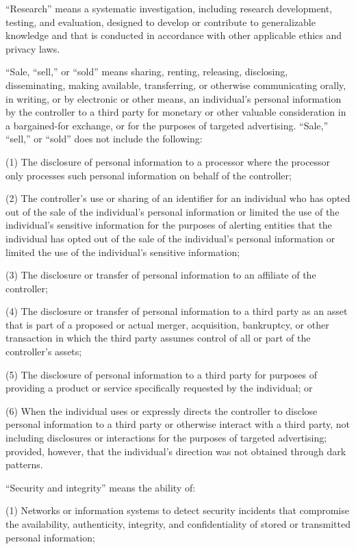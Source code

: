 “Research” means a systematic investigation, including research development, testing, and evaluation, designed to develop or contribute to generalizable knowledge and that is conducted in accordance with other applicable ethics and privacy laws.

“Sale, “sell,” or “sold” means sharing, renting, releasing, disclosing, disseminating, making available, transferring, or otherwise communicating orally, in writing, or by electronic or other means, an individual’s personal information by the controller to a third party for monetary or other valuable consideration in a bargained-for exchange, or for the purposes of targeted advertising. “Sale,” “sell,” or “sold” does not include the following:

(1) The disclosure of personal information to a processor where the processor only processes such personal information on behalf of the controller;

(2) The controller’s use or sharing of an identifier for an individual who has opted out of the sale of the individual’s personal information or limited the use of the individual’s sensitive information for the purposes of alerting entities that the individual has opted out of the sale of the individual’s personal information or limited the use of the individual’s sensitive information;

(3) The disclosure or transfer of personal information to an affiliate of the controller; 

(4) The disclosure or transfer of personal information to a third party as an asset that is part of a proposed or actual merger, acquisition, bankruptcy, or other transaction in which the third party assumes control of all or part of the controller’s assets;

(5) The disclosure of personal information to a third party for purposes of providing a product or service specifically requested by the individual; or

(6) When the individual uses or expressly directs the controller to disclose personal information to a third party or otherwise interact with a third party, not including disclosures or interactions for the purposes of targeted advertising; provided, however, that the individual’s direction was not obtained through dark patterns. 

“Security and integrity” means the ability of:

(1) Networks or information systems to detect security incidents that compromise the availability, authenticity, integrity, and confidentiality of stored or transmitted personal information;

